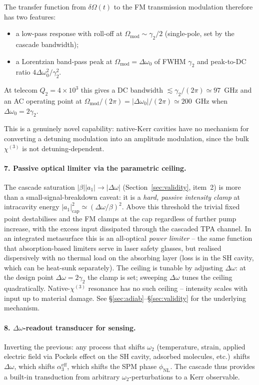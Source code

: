 \documentclass[11pt,a4paper]{article}
\newcommand{\chithree}{\chi^{(3)}}
\newcommand{\Dom}{\Delta\omega}
\begin{document}
The transfer function from $\delta\Omega(t)$ to the FM transmission
modulation therefore has two features:
\begin{itemize}\setlength{\itemsep}{1pt}
\item a low-pass response with roll-off at $\Omega_\text{mod}\sim\gamma_2/2$
      (single-pole, set by the cascade bandwidth);
\item a Lorentzian band-pass peak at $\Omega_\text{mod}=\Dom_0$ of
      FWHM $\gamma_2$ and peak-to-DC ratio $4\Dom_0^{2}/\gamma_2^{2}$.
\end{itemize}
At telecom $Q_2=4{\times}10^{3}$ this gives a DC bandwidth
$\lesssim\gamma_2/(2\pi)\!\simeq\!97$~GHz and an AC operating point at
$\Omega_\text{mod}/(2\pi)=|\Dom_0|/(2\pi)\simeq 200$~GHz when
$\Dom_0=2\gamma_2$.

This is a genuinely novel capability: native-Kerr cavities have no
mechanism for converting a detuning modulation into an amplitude
modulation, since the bulk $\chithree$ is not detuning-dependent.

\paragraph{7. Passive optical limiter via the parametric ceiling.}
The cascade saturation $|\beta||a_1|\to|\Dom|$
(Section~\ref{sec:validity}, item~2) is more than a small-signal-breakdown
caveat: it is a \emph{hard, passive intensity clamp} at intracavity
energy $|a_1|^{2}_\text{cap}\simeq(\Dom/\beta)^{2}$.  Above this
threshold the trivial fixed point destabilises and the FM clamps at
the cap regardless of further pump increase, with the excess input
dissipated through the cascaded TPA channel.  In an integrated
metasurface this is an all-optical \emph{power limiter} -- the same
function that absorption-based limiters serve in laser safety glasses,
but realised dispersively with no thermal load on the absorbing layer
(loss is in the SH cavity, which can be heat-sunk separately).
The ceiling is tunable by adjusting $\Dom$: at the design point
$\Dom=2\gamma_2$ the clamp is set; sweeping $\Dom$ tunes the ceiling
quadratically.  Native-$\chithree$ resonance has no such ceiling --
intensity scales with input up to material damage.  See
\S\ref{sec:adiab}--\S\ref{sec:validity} for the underlying mechanism.

\paragraph{8. $\Dom$-readout transducer for sensing.}
Inverting the previous: any process that shifts $\omega_2$
(temperature, strain, applied electric field via Pockels effect on
the SH cavity, adsorbed molecules, etc.)\ shifts $\Dom$, which shifts
$\alpha_3^\text{eff}$, which shifts the SPM phase $\phi_\text{NL}$.
The cascade thus provides a built-in transduction from arbitrary
$\omega_2$-perturbations to a Kerr observable.
\end{document}
